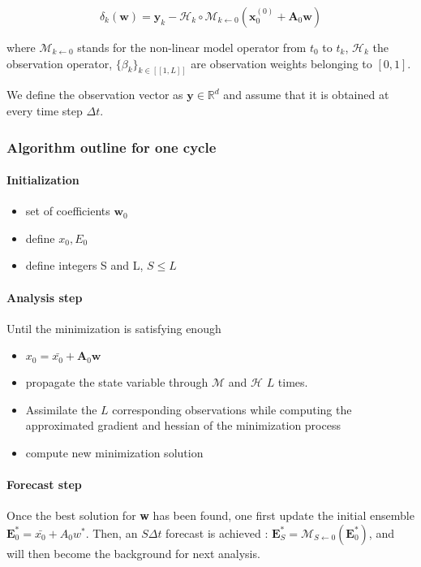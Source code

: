 \documentclass[a4,12pt]{article}
\begin{document}
$$\delta_{k}(\textbf{w}) = \textbf{y}_{k} - \mathcal{H}_{k}\circ \mathcal{M}_{k\leftarrow 0}(\textbf{x}_{0}^{(0)} + \textbf{A}_{0}\textbf{w})$$

where $\mathcal{M}_{k\leftarrow 0}$ stands for the non-linear model operator from $t_{0}$ to $t_{k}$, $\mathcal{H}_{k}$ the observation operator, $\{\beta_k\}_{k \in [\![1,L]\!]}$ are observation weights belonging to $[0,1]$. 

We define the observation vector as $\textbf{y} \in \mathbb{R}^d$ and assume that it is obtained at every time step $\Delta t$. \\
\subsubsection{Algorithm outline for one cycle}
\paragraph{Initialization}
\begin{itemize}
\item set of coefficients $\textbf{w}_0$
\item define $x_0, E_0$
\item define integers S and L, $S \le L$
\end{itemize}
\paragraph{Analysis step}
Until the minimization is satisfying enough
\begin{itemize}
\item $x_0 = \bar{x_0} + \textbf{A}_0 \textbf{w}$
\item propagate the state variable through $\mathcal{M}$ and $\mathcal{H}$ $L$ times.
\item Assimilate the $L$ corresponding observations while computing the approximated gradient and hessian of the minimization process
\item compute new minimization solution
\end{itemize}
\paragraph{Forecast step}
Once the best solution for \textbf{w} has been found, one first update the initial ensemble $\textbf{E}^{*}_0 = \bar{x_0} + A_{0}w^{*}$. Then, an $S\Delta t$ forecast is achieved : $\textbf{E}^{*}_S = \mathcal{M}_{S\leftarrow 0}(\textbf{E}^{*}_0)$, and will then become the background for next analysis.
\end{document}
